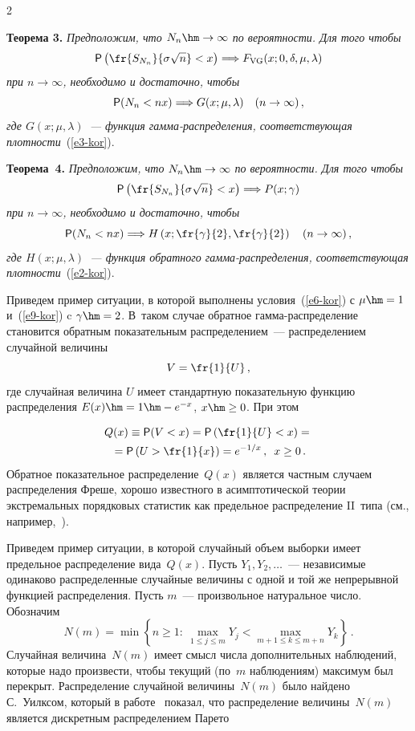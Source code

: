 \begin{multicols}{2}
\smallskip

\noindent
\textbf{Теорема 3.} \textit{Предположим, что $N_n\hm\to\infty$ по
вероятности. Для того чтобы}
$$
{\sf P}\left(\fr{S_{N_n}}{\sigma\sqrt{n}}<x\right)\Longrightarrow
F_{\mathrm{VG}}(x;0,\delta,\mu,\lambda)
$$
\textit{при $n\to\infty$, необходимо и достаточно, чтобы}
$$
{\sf P}(N_n<nx)\Longrightarrow G(x;\mu,\lambda)\quad  (n\to\infty)\,,
$$
\textit{где $G(x;\mu,\lambda)$~--- функция гам\-ма-рас\-пре\-де\-ле\-ния,
соответствующая плотности}~(\ref{e3-kor}). 

\smallskip

\noindent
\textbf{Теорема~4.} \textit{Предположим, что $N_n\hm\to\infty$ по
вероятности. Для того чтобы}
$$
{\sf P}\left(\fr{S_{N_n}}{\sigma\sqrt{n}}<x\right)\Longrightarrow
P(x;\gamma)
$$
\textit{при $n\to\infty$, необходимо и достаточно, чтобы}
\begin{equation}
{\sf P}(N_n<nx)\Longrightarrow H\left(x;\fr{\gamma}{2},\fr{\gamma}{2}\right)\quad
(n\to\infty)\,,\label{e9-kor}
\end{equation}
\textit{где $H(x;\mu,\lambda)$~--- функция обратного гамма-рас\-пре\-де\-ле\-ния,
соответствующая плотности}~(\ref{e2-kor}). 

\smallskip

Приведем пример ситуации, в которой выполнены условия~(\ref{e6-kor}) с
$\mu\hm=1$ и~(\ref{e9-kor}) c $\gamma\hm=2$. В~таком случае обратное
гамма-распределение становится обратным показательным
распределением~--- распределением случайной величины
$$
V=\fr{1}{U}\,,
$$
где случайная величина $U$ имеет стандартную показательную функцию
распределения $E(x)\hm=1\hm-e^{-x}$, $x\hm\ge0$. При этом

\noindent
\begin{multline*}
Q(x)\equiv {\sf P}(V<x)={\sf P}\left(\fr{1}{U}<x\right)={}\\
{}={\sf
P}\left(U>\fr{1}{x}\right)=e^{-1/x}\,,\enskip x\ge0\,.
\end{multline*}
Обратное показательное распределение~$Q(x)$ является частным
случаем распределения Фреше, хорошо известного в асимптотической
теории экстремальных порядковых статистик как предельное
распределение II~типа (см., например,~\cite{Gumbel1965}).

Приведем пример ситуации, в которой случайный объем выборки имеет
предельное распределение вида~$Q(x)$. Пусть $Y_1,Y_2,\ldots$~---
независимые одинаково распределенные случайные величины с одной и
той же непрерывной функцией распределения. Пусть $m$~---
произвольное натуральное число. Обозначим
$$
N(m)=\min\left\{n\ge1:\ \max\limits_{1\le j\le m}Y_j<\max\limits_{m+1\le k\le
m+n}Y_k\right\}\,.
$$
Случайная величина~$N(m)$ имеет смысл чис\-ла дополнительных
наблюдений, которые надо произвести, чтобы текущий (по~$m$
наблюдениям) максимум был перекрыт. Распределение случайной
величины~$N(m)$ было найдено С.~Уилксом, который в работе~\cite{Wilks1959} 
показал, что распределение величины~$N(m)$
является дискретным распределением Парето


\end{multicols}
